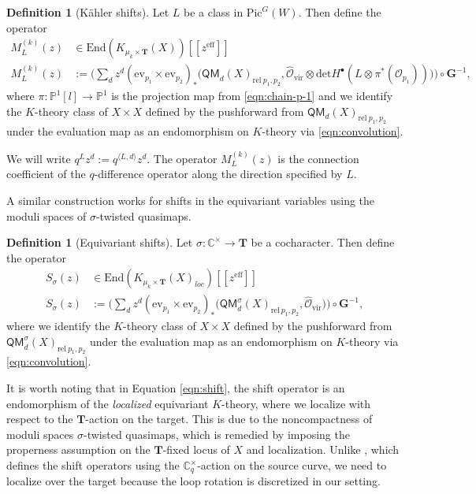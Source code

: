 \documentclass[reqno]{amsart}
\numberwithin{equation}{section}
\numberwithin{equation}{section}
\numberwithin{equation}{section}
\theoremstyle{definition}
\newtheorem{defn}[thm]{Definition}
\theoremstyle{remark}
\theoremstyle{remark}
\begin{document}
\begin{defn}[K\"ahler shifts]\label{defn:kahler-shift}
Let $L$ be a class in $\mathrm{Pic}^G(W)$. Then define the operator
\begin{equation}\label{eqn:kahler-shift}
\begin{aligned}
 M_{L}^{(k)}(z) &\in \mathrm{End}(K_{\mu_k \times \mathbf{T}}(X))[\![ z^{\mathrm{eff}} ]\!] \\
 M_{L}^{(k)}(z) &:= \big( \sum_d z^d (\mathrm{ev}_{p_1} \times \mathrm{ev}_{p_2})_* \big( \mathsf{QM}_{d}(X)_{\mathrm{rel} \ p_1, p_2}, \hat{\mathcal{O}}_{\mathrm{vir}} \otimes \mathrm{det} H^{\bullet}(L \otimes \pi^*(\mathcal{O}_{p_1})) \big) \big)\circ \mathbf{G}^{-1},
\end{aligned}
\end{equation}
where $\pi: \mathbb{P}^1[l] \to \mathbb{P}^1$ is the projection map from \eqref{eqn:chain-p-1} and we identify the $K$-theory class of $X \times X$ defined by the pushforward from $\mathsf{QM}_{d}(X)_{\mathrm{rel} \ p_1, p_2}$ under the evaluation map as an endomorphism on $K$-theory via \eqref{eqn:convolution}.
\end{defn}
We will write $q^L z^d := q^{\langle L, d \rangle}z^d$. The operator $M_{L}^{(k)}(z)$ is the connection coefficient of the $q$-difference operator along the direction specified by $L$. 

A similar construction works for shifts in the equivariant variables using the moduli spaces of $\sigma$-twisted quasimaps.

\begin{defn}[Equivariant shifts]\label{defn:equiv-shift}
    Let $\sigma: \mathbb{C}^{\times} \to \mathbf{T}$ be a cocharacter. Then define the operator
    \begin{equation}\label{eqn:shift}
        \begin{aligned}
            S_{\sigma}(z) &\in \mathrm{End}(K_{\mu_k \times \mathbf{T}} (X)_{loc})[\![ z^{\mathrm{eff}} ]\!] \\
            S_{\sigma}(z) &:= \big( \sum_d z^d(\mathrm{ev}_{p_1} \times \mathrm{ev}_{p_2})_* \big( \mathsf{QM}^{\sigma}_{d}(X)_{\mathrm{rel} \ p_1, p_2}, \hat{\mathcal{O}}_{\mathrm{vir}} \big) \big)\circ \mathbf{G}^{-1},
        \end{aligned}
    \end{equation}
    where we identify the $K$-theory class of $X \times X$ defined by the pushforward from $\mathsf{QM}^{\sigma}_{d}(X)_{\mathrm{rel} \ p_1, p_2}$ under the evaluation map as an endomorphism on $K$-theory via \eqref{eqn:convolution}.
\end{defn}
It is worth noting that in Equation \eqref{eqn:shift}, the shift operator is an endomorphism of the \emph{localized} equivariant $K$-theory, where we localize with respect to the $\mathbf{T}$-action on the target. This is due to the noncompactness of moduli spaces $\sigma$-twisted quasimaps, which is remedied by imposing the properness assumption on the $\mathbf{T}$-fixed locus of $X$ and localization. Unlike \cite[Section 8]{Oko17}, which defines the shift operators using the $\mathbb{C}^{\times}_q$-action on the source curve, we need to localize over the target because the loop rotation is discretized in our setting.
\end{document}
